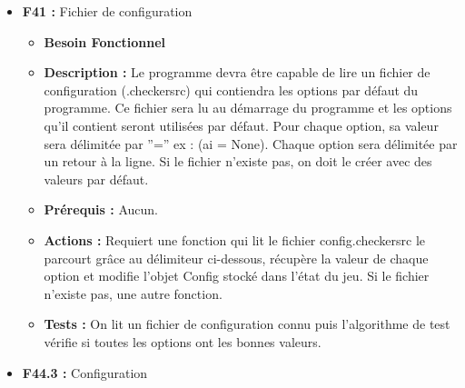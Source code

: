 \documentclass{article}
\begin{document}
\begin{itemize}
\begin{itemize}
\begin{itemize}
            \smallskip
            \item \textbf{F35.2 :} Revenir en arrière et aller en avant
            \begin{itemize}
                \item \textbf{Actions :} Utiliser undo revient en arrière d’un coup en jouant un coup vide sur la case du tour. De plus, cela rajoute ce coup dans l’historique des coups annulés. Jouer un coup alors que des coups ont été annulés vide l’historique des coups annulés. Utiliser redo rejoue un coup annulé.
                \item \textbf{Tests :} Vérifier que l’utilisation de ‘undo’ et ‘redo’ manipule correctement les historiques et le nombre de coups en vérifiant leurs états.
                Prérequis : Module pour l'historique des coups (\textbf{F30.2}), jouer un coup (\textbf{F29.3}).
            \end{itemize}
        \end{itemize}
    \end{itemize}
\bigskip
    \item \textbf{F41 :} Fichier de configuration
    \begin{itemize}
        \item \textbf{Besoin Fonctionnel}
        \item \textbf{Description :} Le programme devra être capable de lire un fichier de configuration (.checkersrc) qui contiendra les options par défaut du programme. Ce fichier sera lu au démarrage du programme et les options qu’il contient seront utilisées par défaut. Pour chaque option, sa valeur sera délimitée par ”=” ex : (ai = None). Chaque option sera délimitée par un retour à la ligne. Si le fichier n'existe pas, on doit le créer avec des valeurs par défaut.
        \item \textbf{Prérequis :} Aucun.
        \item \textbf{Actions :} Requiert une fonction qui lit le fichier config.checkersrc le parcourt grâce au délimiteur ci-dessous, récupère la valeur de chaque option et modifie l'objet Config stocké dans l'état du jeu. Si le fichier n'existe pas, une autre fonction.
        \item \textbf{Tests :} On lit un fichier de configuration connu puis l’algorithme de test vérifie si toutes les options ont les bonnes valeurs.
    \end{itemize}
\bigskip
    \item \textbf{F44.3 :} Configuration
    \begin{itemize}

\end{itemize}
\end{itemize}
\end{document}

